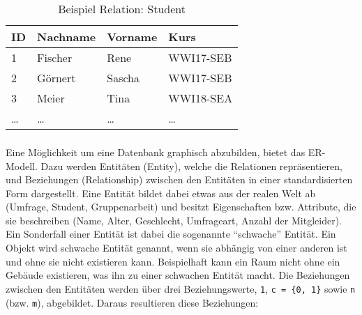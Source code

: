 \begin{table}
    \begin{tabular}[h]{l | l | l | l}
        ID & Nachname & Vorname & Kurs \\ \hline
        1 & Fischer & Rene & WWI17-SEB \\
        2 & Görnert & Sascha & WWI17-SEB \\
        3 & Meier & Tina & WWI18-SEA \\
        \dots & \dots & \dots & \dots \\
        \end{tabular}
        \caption{Beispiel Relation: Student}
        \label{tab:RelStudent}
\end{table}

\subsubsection{}
Eine Möglichkeit um eine Datenbank graphisch abzubilden, bietet das \ac{ER-Modell}.
Dazu werden Entitäten (Entity), welche die Relationen repräsentieren, und Beziehungen (Relationship) zwischen den Entitäten in einer standardisierten Form dargestellt.
Eine Entität bildet dabei etwas aus der realen Welt ab (Umfrage, Student, Gruppenarbeit) und besitzt Eigenschaften bzw. Attribute, die sie beschreiben (Name, Alter, Geschlecht, Umfrageart, Anzahl der Mitgleider).
Ein Sonderfall einer Entität ist dabei die sogenannte \enquote{schwache} Entität.
Ein Objekt wird schwache Entität genannt, wenn sie abhängig von einer anderen ist und ohne sie nicht existieren kann.
Beispielhaft kann ein Raum nicht ohne ein Gebäude existieren, was ihn zu einer schwachen Entität macht. 
Die Beziehungen zwischen den Entitäten werden über drei Beziehungswerte, \texttt{1}, \texttt{c = \{0, 1\}} sowie \texttt{n} (bzw. \texttt{m}), abgebildet.
Daraus resultieren diese Beziehungen:


